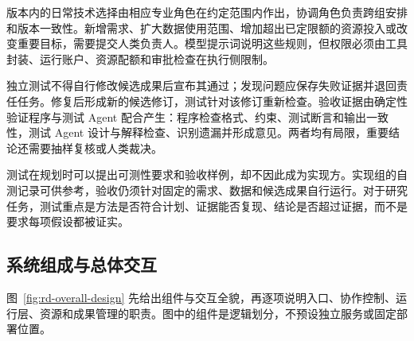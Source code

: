 \documentclass[11pt,a4paper]{article}
\begin{document}
版本内的日常技术选择由相应专业角色在约定范围内作出，协调角色负责跨组安排和版本一致性。新增需求、扩大数据使用范围、增加超出已定限额的资源投入或改变重要目标，需要提交人类负责人。模型提示词说明这些规则，但权限必须由工具封装、运行账户、资源配额和审批检查在执行侧限制。

独立测试不得自行修改候选成果后宣布其通过；发现问题应保存失败证据并退回责任任务。修复后形成新的候选修订，测试针对该修订重新检查。验收证据由确定性验证程序与测试 Agent 配合产生：程序检查格式、约束、测试断言和输出一致性，测试 Agent 设计与解释检查、识别遗漏并形成意见。两者均有局限，重要结论还需要抽样复核或人类裁决。

测试在规划时可以提出可测性要求和验收样例，却不因此成为实现方。实现组的自测记录可供参考，验收仍须针对固定的需求、数据和候选成果自行运行。对于研究任务，测试重点是方法是否符合计划、证据能否复现、结论是否超过证据，而不是要求每项假设都被证实。

\Needspace{12cm}
\subsection{系统组成与总体交互}

图~\ref{fig:rd-overall-design} 先给出组件与交互全貌，再逐项说明入口、协作控制、运行层、资源和成果管理的职责。图中的组件是逻辑划分，不预设独立服务或固定部署位置。
\end{document}
